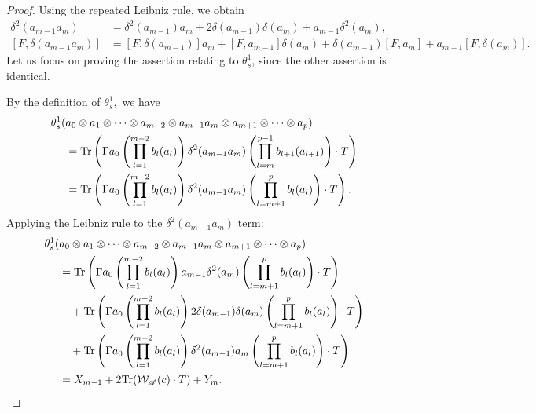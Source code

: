     \begin{proof} 
        Using the repeated Leibniz rule, we obtain
        \begin{align*}
            \delta^2(a_{m-1}a_m)   &= \delta^2(a_{m-1})a_m+2\delta(a_{m-1})\delta(a_m)+a_{m-1}\delta^2(a_m),\\
            [F,\delta(a_{m-1}a_m)] &= [F,\delta(a_{m-1})]a_m+[F,a_{m-1}]\delta(a_m)+\delta(a_{m-1})[F,a_m]+a_{m-1}[F,\delta(a_m)].
        \end{align*}
        Let us focus on proving the assertion relating to $\theta^1_s$, since the other assertion is identical.

        By the definition of $\theta_s^1,$ we have
        \begin{align*}
            \theta_s^1(&a_0\otimes a_1\otimes\cdots\otimes a_{m-2}\otimes a_{m-1}a_m\otimes a_{m+1}\otimes\cdots\otimes a_p)\\
                     &= {\rm Tr}\left(\Gamma a_0\left(\prod_{l=1}^{m-2}b_l(a_l)\right)\delta^2(a_{m-1}a_m)\left(\prod_{l=m}^{p-1}b_{l+1}(a_{l+1})\right)\cdot T\right)\\
                     &= {\rm Tr}\left(\Gamma a_0\left(\prod_{l=1}^{m-2}b_l(a_l)\right)\delta^2(a_{m-1}a_m)\left(\prod_{l=m+1}^pb_l(a_l)\right)\cdot T\right).
        \end{align*}
        Applying the Leibniz rule to the $\delta^2(a_{m-1}a_m)$ term:
        \begin{align*}
            \theta_s^1(&a_0\otimes a_1\otimes\cdots\otimes a_{m-2}\otimes a_{m-1}a_m\otimes a_{m+1}\otimes\cdots\otimes a_p)\\
                     &= {\rm Tr}\left(\Gamma a_0\left(\prod_{l=1}^{m-2}b_l(a_l)\right) a_{m-1}\delta^2(a_m)\left(\prod_{l=m+1}^pb_l(a_l)\right)\cdot T\right)\\
                     &\quad + {\rm Tr}\left(\Gamma a_0\left(\prod_{l=1}^{m-2}b_l(a_l)\right) 2\delta(a_{m-1})\delta(a_m)\left(\prod_{l=m+1}^pb_l(a_l)\right)\cdot T\right)\\
                     &\quad + {\rm Tr}\left(\Gamma a_0\left(\prod_{l=1}^{m-2}b_l(a_l)\right)\delta^2(a_{m-1})a_m\left(\prod_{l=m+1}^pb_l(a_l)\right)\cdot T\right)\\
                     &=X_{m-1}+2{\rm Tr}(\mathcal{W}_{\mathscr{A}}(c)\cdot T)+Y_m.
        \end{align*}
    \end{proof}

